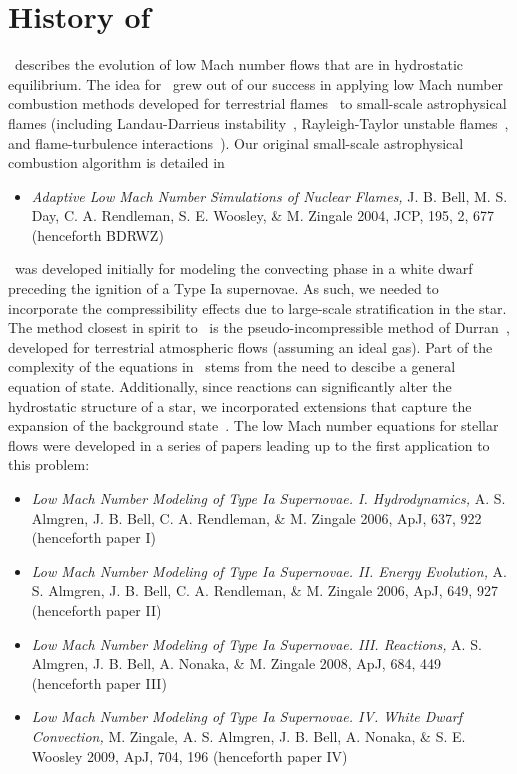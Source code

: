 \section{History of \maestro}

\maestro\ describes the evolution of low Mach number flows that are in
hydrostatic equilibrium.  The idea for \maestro\ grew out of our
success in applying low Mach number combustion methods developed for
terrestrial flames~\cite{DayBell00} to small-scale astrophysical
flames (including Landau-Darrieus instability~\cite{SNld},
Rayleigh-Taylor unstable flames~\cite{SNrt3d}, and flame-turbulence
interactions~\cite{SNturb}).  Our original small-scale astrophysical
combustion algorithm is detailed in
\begin{itemize}
\item {\em Adaptive Low Mach Number Simulations of Nuclear Flames,}
J. B. Bell, M. S. Day, C. A. Rendleman, S. E. Woosley, \& M. Zingale
2004, JCP, 195, 2, 677 (henceforth BDRWZ)
\end{itemize}

\noindent \maestro\ was developed initially for modeling the convecting
phase in a white dwarf preceding the ignition of a Type Ia supernovae.
As such, we needed to incorporate the compressibility effects due to
large-scale stratification in the star.  The method closest in spirit
to \maestro\ is the pseudo-incompressible method of
Durran~\cite{durran}, developed for terrestrial atmospheric flows
(assuming an ideal gas).  Part of the complexity of the equations in
\maestro\ stems from the need to descibe a general equation of state.
Additionally, since reactions can significantly alter the hydrostatic
structure of a star, we incorporated extensions that capture the
expansion of the background state~\cite{almgren:2000}.  The low Mach
number equations for stellar flows were developed in a series of
papers leading up to the first application to this problem:
\begin{itemize}
\item {\em Low Mach Number Modeling of Type Ia
  Supernovae. I. Hydrodynamics,} A. S. Almgren, J. B. Bell, 
  C. A. Rendleman, \& M. Zingale 2006, ApJ, 637, 922 (henceforth
  paper I)

\item {\em Low Mach Number Modeling of Type Ia Supernovae. II. Energy
  Evolution,} A. S. Almgren, J. B. Bell, C. A. Rendleman, \& M. Zingale
  2006, ApJ, 649, 927 (henceforth paper II)

\item {\em Low Mach Number Modeling of Type Ia Supernovae. III. Reactions,}
  A. S. Almgren, J. B. Bell, A. Nonaka, \& M. Zingale
  2008, ApJ, 684, 449 (henceforth paper III)

\item {\em Low Mach Number Modeling of Type Ia Supernovae. IV. White Dwarf Convection,}
  M. Zingale, A. S. Almgren, J. B. Bell, A. Nonaka, \& S. E. Woosley
  2009, ApJ, 704, 196 (henceforth paper IV)
\end{itemize}

